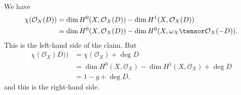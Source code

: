 We have
\begin{align*}
	\chi(\mathcal{O}_X(D)) &= \dim H^0(X, \mathcal{O}_X(D)) - \dim H^1(X, \mathcal{O}_X(D))\\
	&= \dim H^0(X, \mathcal{O}_X(D)) - \dim H^0(X, \omega_X \tensor \mathcal{O}_X(-D)).
\end{align*}
This is the left-hand side of the claim.
But
\begin{align*}
	\chi(\mathcal{O}_X)D)) &= \chi(\mathcal{O}_X) + \deg D\\
	&= \dim H^0(X, \mathcal{O}_X) - \dim H^1(X, \mathcal{O}_X) + \deg D\\
	&= 1 - g + \deg D,
\end{align*}
and this is the right-hand side.
